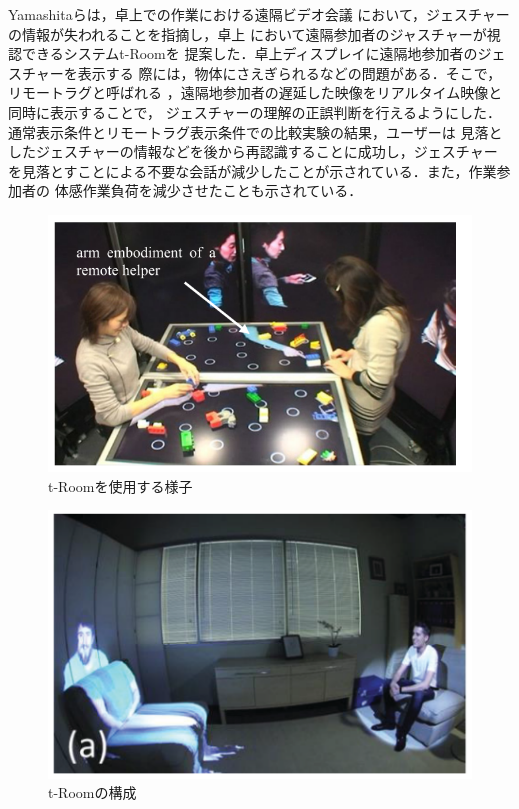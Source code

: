 Yamashitaら\cite{28}は，卓上での作業における遠隔ビデオ会議
において，ジェスチャーの情報が失われることを指摘し，卓上
において遠隔参加者のジャスチャーが視認できるシステムt-Roomを
提案した．卓上ディスプレイに遠隔地参加者のジェスチャーを表示する
際には，物体にさえぎられるなどの問題がある．そこで，リモートラグと呼ばれる
，遠隔地参加者の遅延した映像をリアルタイム映像と同時に表示することで，
ジェスチャーの理解の正誤判断を行えるようにした．
通常表示条件とリモートラグ表示条件での比較実験の結果，ユーザーは
見落としたジェスチャーの情報などを後から再認識することに成功し，ジェスチャー
を見落とすことによる不要な会話が減少したことが示されている．また，作業参加者の
体感作業負荷を減少させたことも示されている．

\begin{figure}[tp]
  \centering
  \includegraphics[scale=0.7]{fig/tRoom.png}
  \caption{t-Roomを使用する様子\cite{27}}
\end{figure}

\begin{figure}[tp]
  \centering
  \includegraphics[scale=1.0]{fig/2room2.png}
  \caption{t-Roomの構成\cite{27}}
\end{figure}

